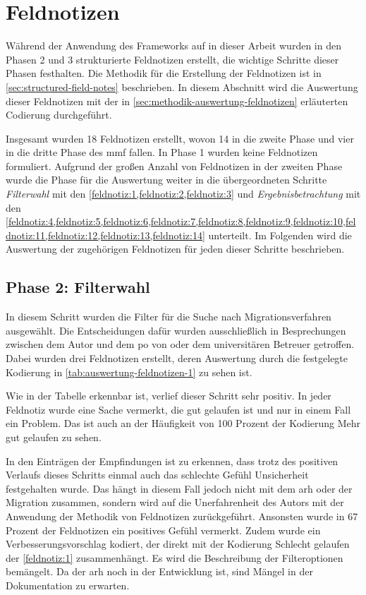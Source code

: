 \section{Feldnotizen}
\label{sec:auswertung-feldnotizen}

Während der Anwendung des Frameworks auf \jf in dieser Arbeit wurden in den Phasen 2 und 3 strukturierte Feldnotizen erstellt, die wichtige Schritte dieser Phasen festhalten.
Die Methodik für die Erstellung der Feldnotizen ist in \cref{sec:structured-field-notes} beschrieben.
In diesem Abschnitt wird die Auswertung dieser Feldnotizen mit der in \cref{sec:methodik-auswertung-feldnotizen} erläuterten Codierung  durchgeführt.

Insgesamt wurden 18 Feldnotizen erstellt, wovon 14 in die zweite Phase und vier in die dritte Phase des \gls{mmf} fallen.
In Phase 1 wurden keine Feldnotizen formuliert.
Aufgrund der großen Anzahl von Feldnotizen in der zweiten Phase wurde die Phase für die Auswertung weiter in die übergeordneten Schritte \emph{Filterwahl} mit den \cref{feldnotiz:1,feldnotiz:2,feldnotiz:3} und \emph{Ergebnisbetrachtung} mit den \cref{feldnotiz:4,feldnotiz:5,feldnotiz:6,feldnotiz:7,feldnotiz:8,feldnotiz:9,feldnotiz:10,feldnotiz:11,feldnotiz:12,feldnotiz:13,feldnotiz:14} unterteilt.
Im Folgenden wird die Auswertung der zugehörigen Feldnotizen für jeden dieser Schritte beschrieben.

\subsection{Phase 2: Filterwahl}

In diesem Schritt wurden die Filter für die Suche nach Migrationsverfahren ausgewählt.
Die Entscheidungen dafür wurden ausschließlich in Besprechungen zwischen dem Autor und dem \gls{po} von \jf oder dem universitären Betreuer getroffen.
Dabei wurden drei Feldnotizen erstellt, deren Auswertung durch die festgelegte Kodierung in \cref{tab:auswertung-feldnotizen-1} zu sehen ist.



Wie in der Tabelle erkennbar ist, verlief dieser Schritt sehr positiv.
In jeder Feldnotiz wurde eine Sache vermerkt, die gut gelaufen ist und nur in einem Fall ein Problem.
Das ist auch an der Häufigkeit von 100 Prozent der Kodierung \glqq Mehr gut gelaufen\grqq{} zu sehen.

In den Einträgen der Empfindungen ist zu erkennen, dass trotz des positiven Verlaufs dieses Schritts einmal auch das schlechte Gefühl \glqq Unsicherheit\grqq{} festgehalten wurde.
Das hängt in diesem Fall jedoch nicht mit dem \gls{arh} oder der Migration zusammen, sondern wird auf die Unerfahrenheit des Autors mit der Anwendung der Methodik von Feldnotizen zurückgeführt.
Ansonsten wurde in 67 Prozent der Feldnotizen ein positives Gefühl vermerkt.
Zudem wurde ein Verbesserungsvorschlag kodiert, der direkt mit der Kodierung \glqq Schlecht gelaufen\grqq{} der \cref{feldnotiz:1} zusammenhängt.
Es wird die Beschreibung der Filteroptionen bemängelt.
Da der \gls{arh} noch in der Entwicklung ist, sind Mängel in der Dokumentation zu erwarten.


